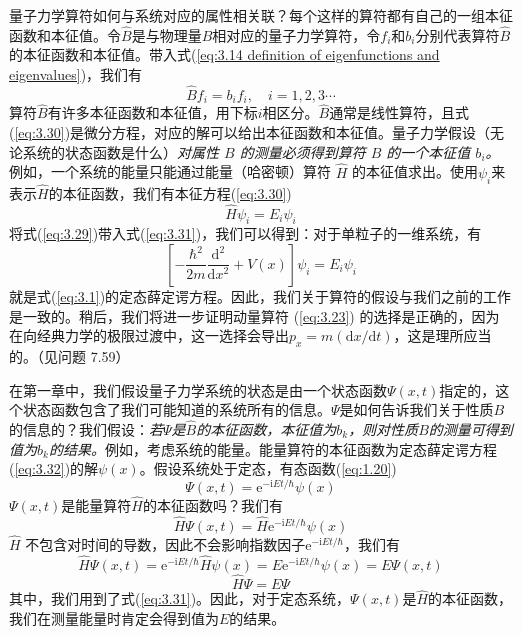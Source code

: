 	量子力学算符如何与系统对应的属性相关联？每个这样的算符都有自己的一组本征函数和本征值。令$\hat{B}$是与物理量$B$相对应的量子力学算符，令$f_i$和$b_i$分别代表算符$\hat{B}$的本征函数和本征值。带入式(\ref{eq:3.14 definition of eigenfunctions and eigenvalues})，我们有
	\begin{equation}
		\hat{B}f_i = b_if_i, \quad i = 1,2,3\cdots
		\label{eq:3.30}
	\end{equation}
	算符$\hat{B}$有许多本征函数和本征值，用下标$i$相区分。$\hat{B}$通常是线性算符，且式(\ref{eq:3.30})是微分方程，对应的解可以给出本征函数和本征值。量子力学假设（无论系统的状态函数是什么）\textit{对属性 $B$ 的测量必须得到算符 $\hat{B}$ 的一个本征值 $b_i$。}例如，一个系统的能量只能通过能量（哈密顿）算符 $\hat{H}$ 的本征值求出。使用$\psi_i$来表示$\hat{H}$的本征函数，我们有本征方程(\ref{eq:3.30})
	\begin{equation}
		\boxed{
			\hat{H}\psi_i = E_i\psi_i
		}
		\label{eq:3.31}
	\end{equation}
	将式(\ref{eq:3.29})带入式(\ref{eq:3.31})，我们可以得到：对于单粒子的一维系统，有
	\begin{equation}
		\left[-\frac{\hbar^2}{2m}\frac{\mathrm{d}^2}{\mathrm{d}x^2}+V\left(x\right)\right]\psi_i = 
		E_i\psi_i
		\label{eq:3.32}
	\end{equation}
	就是式(\ref{eq:3.1})的定态薛定谔方程。因此，我们关于算符的假设与我们之前的工作是一致的。稍后，我们将进一步证明动量算符 (\ref{eq:3.23}) 的选择是正确的，因为在向经典力学的极限过渡中，这一选择会导出$p_x = m\left(\mathrm{d}x / \mathrm{d}t\right)$，这是理所应当的。（见问题 7.59）

	在第一章中，我们假设量子力学系统的状态是由一个状态函数$\Psi$$\left(x,t\right)$指定的，这个状态函数包含了我们可能知道的系统所有的信息。$\Psi$是如何告诉我们关于性质$B$的信息的？我们假设：\textit{若$\Psi$是$\hat{B}$的本征函数，本征值为$b_k$，则对性质$B$的测量可得到值为$b_k$的结果。}例如，考虑系统的能量。能量算符的本征函数为定态薛定谔方程(\ref{eq:3.32})的解$\psi\left(x\right)$。假设系统处于定态，有态函数(\ref{eq:1.20})
	\begin{equation}
		\Psi\left(x,t\right) = \mathrm{e}^{-\mathrm{i}Et/\hbar}\psi\left(x\right)
		\label{eq:3.33}
	\end{equation}
	$\Psi\left(x,t\right)$是能量算符$\hat{H}$的本征函数吗？我们有
	\begin{equation*}
		\hat{H}\Psi\left(x,t\right) = \hat{H}\mathrm{e}^{-\mathrm{i}Et/\hbar}\psi\left(x\right)
	\end{equation*}
	$\hat{H}$ 不包含对时间的导数，因此不会影响指数因子$\mathrm{e}^{-\mathrm{i}Et/\hbar}$，我们有
	\begin{equation*}
		\hat{H}\Psi\left(x,t\right) = \mathrm{e}^{-\mathrm{i}Et/\hbar}\hat{H}\psi\left(x\right) = E \mathrm{e}^{-\mathrm{i}Et/\hbar} \psi\left(x\right) = E \Psi\left(x,t\right)
	\end{equation*}
	\begin{equation}
		\hat{H}\Psi = E\Psi
		\label{eq:3.34}
	\end{equation}
	其中，我们用到了式(\ref{eq:3.31})。因此，对于定态系统，$\Psi\left(x,t\right)$是$\hat{H}$的本征函数，我们在测量能量时肯定会得到值为$E$的结果。


